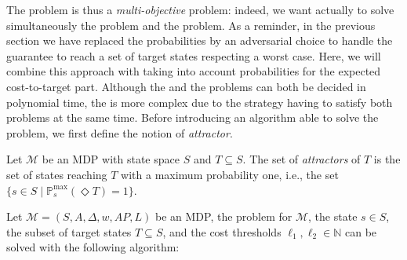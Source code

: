 The \SSPWE{} problem is thus a \textit{multi-objective} problem: indeed, we want actually to solve simultaneously the \SPG{} problem and the \SSPE{} problem.
As a reminder, in the previous section we have replaced the probabilities by an adversarial choice to handle the guarantee to reach a set of target states respecting a worst case.
Here, we will combine this approach with taking into account probabilities for the expected cost-to-target part.
Although the \SSPE{} and the \SPG{} problems can both be decided in polynomial time, the \SSPWE{} is more complex due to the strategy having to satisfy both problems at the same time.
Before introducing an algorithm able to solve the problem, we first define the notion of \textit{attractor}.

\begin{definition}
  Let $\mathcal{M}$ be an MDP with state space $S$ and $T \subseteq S$. The set of \textit{attractors} of $T$ is the set of states reaching $T$ with a maximum probability one, i.e., the set $\{ s \in S \; | \; \mathbb{P}^{\max}_s (\Diamond T) = 1 \}$.
\end{definition}

Let $\mathcal{M}=(S, A, \Delta, w, AP, L)$ be an MDP, the \SSPWE{} problem for $\mathcal{M}$, the state $s \in S$, the subset of target states $T \subseteq S$, and the cost thresholds $\ell_1, \ell_2 \in \mathbb{N}$ can be solved with the following algorithm:


